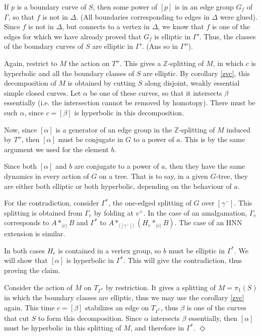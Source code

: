 \documentclass[12pt]{amsart}
\newcommand{\Z}{\mathbb{Z}}
\begin{document}
If $p$ is a boundary curve of $S$, then some power of $[p]$ is in an edge group $G_f$ of $\Gamma$, so that $f$ is not in $\Delta$. (All boundaries corresponding to edges in $\Delta$ were glued). Since $f$ is not in $\Delta$, but connects to a vertex in $\Delta$, we know that $f$ is one of the edges for which we have already proved that $G_f$ is elliptic in $\Gamma'$. Thus, the classes of the boundary curves of $S$ are elliptic in $\Gamma'$. (Ans so in $\Gamma''$).

Again, restrict to $M$ the action on $T''$. This gives a $\Z$-splitting of $M$, in which $c$ is hyperbolic and all the boundary classes of $S$ are elliptic. By corollary \ref{zvc}, this decomposition of $M$ is obtained by cutting $S$ along disjoint, weakly essential simple closed curves. Let $\alpha$ be one of these curves, so that it intersects $\beta$ essentially (i.e. the intersection cannot be removed by homotopy). There must be such $\alpha$, since $c=[\beta]$ is hyperbolic in this decomposition. 

Now, since $[\alpha]$ is a generator of an edge group in the $\Z$-splitting of $M$ induced by $T''$, then $[\alpha]$ must be conjugate in $G$ to a power of $a$. This is by the same argument we used for the element $b$.

Since both $[\alpha]$ and $b$ are conjugate to a power of $a$, then they have the same dynamics in every action of $G$ on a tree. That is to say, in a given $G$-tree, they are either both elliptic or both hyperbolic, depending on the behaviour of $a$.

For the contradiction, consider $\Gamma^*$, the one-edged splitting of $G$ over $[\gamma^-]$. This splitting is obtained from $\Gamma_e$ by folding at $v^+$. In the case of an amalgamation, $\Gamma_e$ corresponds to $A*_{\langle c \rangle}B$ and $\Gamma^*$ to $A*_{\langle[\gamma^-]\rangle}(H_e*_{\langle c\rangle}B)$. The case of an HNN extension is similar.

In both cases $H_e$ is contained in a vertex group, so $b$ must be elliptic in $\Gamma^*$. We will show that $[\alpha]$ is hyperbolic in $\Gamma^*$. This will give the contradiction, thus proving the claim.

Consider the action of $M$ on $T_{\Gamma^*}$ by restriction. It gives a splitting of $M=\pi_1(S)$ in which the boundary classes are elliptic, thus we may use the corollary \ref{zvc} again. This time $c=[\beta]$ stabilizes an edge on $T_{\Gamma^*}$, thus $\beta$ is one of the curves that cut $S$ to form this decomposition. Since $\alpha$ intersects $\beta$ essentially, then $[\alpha]$ must be hyperbolic in this splitting of $M$, and therefore in $\Gamma^*$. $\Diamond$ \\
\end{document}

